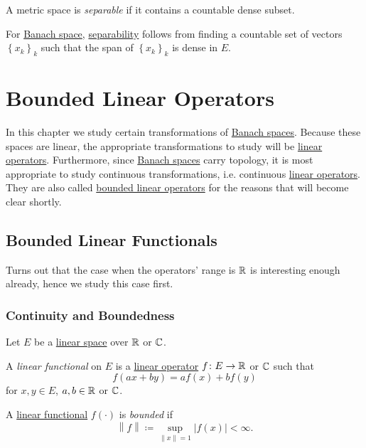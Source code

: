 \begin{definition}[Separable]\label{def:separable}
	A metric space is \emph{separable} if it contains a countable dense subset.
\end{definition}

\begin{remark}
	For \hyperref[def:Banach-space]{Banach space}, \hyperref[def:separable]{separability} follows from finding a countable set of vectors \(\left\{ x_{k}\right\}_k\) such that the span of \(\left\{ x_{k}\right\}_k\) is dense in \(E\).
\end{remark}

\chapter{Bounded Linear Operators}
In this chapter we study certain transformations of \hyperref[def:Banach-space]{Banach spaces}. Because these spaces are linear, the appropriate transformations to study will be \hyperref[def:linear-op]{linear operators}. Furthermore, since \hyperref[def:Banach-space]{Banach spaces} carry topology, it is most appropriate to study continuous transformations, i.e. continuous \hyperref[def:linear-op]{linear operators}. They are also called \hyperref[def:bounded-linear-op]{bounded linear operators} for the reasons that will become clear shortly.

\section{Bounded Linear Functionals}
Turns out that the case when the operators' range is \(\mathbb{\MakeUppercase{r}} \) is interesting enough already, hence we study this case first.
\subsection{Continuity and Boundedness}
\begin{definition*}
	Let \(E\) be a \hyperref[def:linear-vector-space]{linear space} over \(\mathbb{\MakeUppercase{r}} \) or \(\mathbb{\MakeUppercase{c}} \).
	\begin{definition}\label{def:linear-functional}
		A \emph{linear functional} on \(E\) is a \hyperref[def:linear-op]{linear operator} \(f\colon E\to \mathbb{\MakeUppercase{r}} \) or \(\mathbb{\MakeUppercase{c}} \) such that
		\[
			f(ax + by) = af(x) + bf(y)
		\]
		for \(x, y\in E\), \(a, b\in \mathbb{\MakeUppercase{r}} \) or \(\mathbb{\MakeUppercase{c}} \).
	\end{definition}
	\begin{definition}\label{def:bounded-linear-functional}
		A \hyperref[def:linear-functional]{linear functional} \(f(\cdot)\) is \emph{bounded} if
		\[
			\left\lVert f\right\rVert \coloneqq \sup _{\left\lVert x\right\rVert = 1}\left\vert f(x) \right\vert  < \infty.
		\]
	\end{definition}
\end{definition*}

